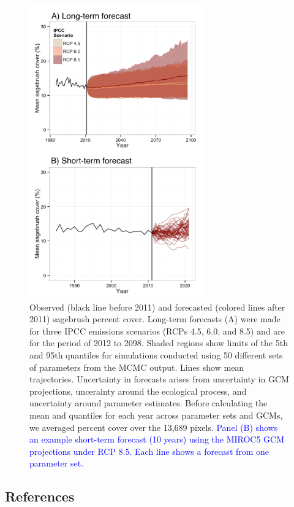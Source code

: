 \documentclass[12pt,]{article}
\begin{document}
\begin{figure}[!ht]
  \centering
      \includegraphics[width=3in]{../figures/figure6.png}
  \caption{Observed (black line before 2011) and forecasted (colored lines after 2011) sagebrush percent cover. Long-term forecasts (A) were made for three IPCC emissions scenarios (RCPs 4.5, 6.0, and 8.5) and are for the period of 2012 to 2098. Shaded regions show limits of the 5th and 95th quantiles for simulations conducted using 50 different sets of parameters from the MCMC output. Lines show mean trajectories. Uncertainty in forecasts arises from uncertainty in GCM projections, uncerainty around the ecological process, and uncertainty around parameter estimates. Before calculating the mean and quantiles for each year across parameter sets and GCMs, we averaged percent cover over the 13,689 pixels. \textcolor{blue}{Panel (B) shows an example short-term forecast (10 years) using the MIROC5 GCM projections under RCP 8.5. Each line shows a forecast from one parameter set.}}
\end{figure}

\newpage{}

\subsection*{References}\label{references}
\end{document}
